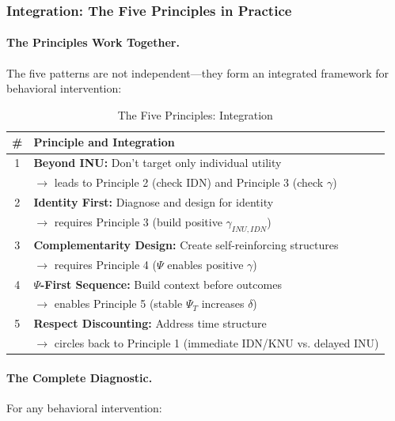 \subsubsection{Integration: The Five Principles in Practice}
\label{subsubsec:five-principles-integration}

\paragraph{The Principles Work Together.}
The five patterns are not independent---they form an integrated framework 
for behavioral intervention:

\begin{table}[htbp]
\centering
\caption{The Five Principles: Integration}
\label{tab:principles-integration}
\renewcommand{\arraystretch}{1.4}
\begin{tabular}{@{}cp{10cm}@{}}
\toprule
\textbf{\#} & \textbf{Principle and Integration} \\
\midrule
1 & \textbf{Beyond INU:} Don't target only individual utility \\
& $\rightarrow$ leads to Principle 2 (check IDN) and Principle 3 (check $\gamma$) \\
\midrule
2 & \textbf{Identity First:} Diagnose and design for identity \\
& $\rightarrow$ requires Principle 3 (build positive $\gamma_{INU,IDN}$) \\
\midrule
3 & \textbf{Complementarity Design:} Create self-reinforcing structures \\
& $\rightarrow$ requires Principle 4 ($\Psi$ enables positive $\gamma$) \\
\midrule
4 & \textbf{$\Psi$-First Sequence:} Build context before outcomes \\
& $\rightarrow$ enables Principle 5 (stable $\Psi_T$ increases $\delta$) \\
\midrule
5 & \textbf{Respect Discounting:} Address time structure \\
& $\rightarrow$ circles back to Principle 1 (immediate IDN/KNU vs. delayed INU) \\
\bottomrule
\end{tabular}
\end{table}

\paragraph{The Complete Diagnostic.}
For any behavioral intervention:

